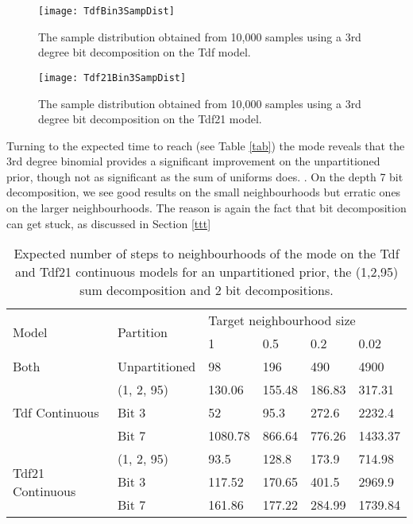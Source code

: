\begin{figure}[H]
    \centering
    \texttt{[image: TdfBin3SampDist]}
    \caption{The sample distribution obtained from 10,000 samples using a 3rd degree bit decomposition on the Tdf model.}
    \label{fig:B3SampDist}
\end{figure}

\begin{figure}[H]
    \centering
    \texttt{[image: Tdf21Bin3SampDist]}
    \caption{The sample distribution obtained from 10,000 samples using a 3rd degree bit decomposition on the Tdf21 model.}
    \label{fig:21B3SampDist}
\end{figure}

Turning to the expected time to reach (see Table \ref{tab}) the mode reveals that the 3rd degree binomial provides a significant improvement on the unpartitioned prior, though not as significant as the sum of uniforms does. . On the depth 7 bit decomposition, we see good results on the small neighbourhoods but erratic ones on the larger neighbourhoods. The reason is again the fact that bit decomposition can get stuck, as discussed in Section \ref{ttt}

\begin{table}[H]
  \centering
  \begin{tabular}{llllll}
    \toprule
    \multirow{2}{*}{Model} & \multirow{2}{*}{Partition} & \multicolumn{4}{l}{Target neighbourhood size} \\
    \cmidrule(r){3-6} 
    & & 1 & 0.5 & 0.2 & 0.02 \\
    \midrule
    Both & Unpartitioned & 98 & 196 & 490 & 4900 \\
    \midrule
    \multirow{3}{*}{Tdf Continuous} & (1, 2, 95) & 130.06 & 155.48  & 186.83 & 317.31 \\
    & Bit 3 & 52 & 95.3  & 272.6 & 2232.4 \\
    & Bit 7 & 1080.78 & 866.64 & 776.26 & 1433.37 \\
    \midrule
    \multirow{3}{*}{Tdf21 Continuous} & (1, 2, 95) & 93.5 & 128.8  & 173.9 & 714.98 \\
    & Bit 3 & 117.52 & 170.65  & 401.5 & 2969.9 \\
    & Bit 7 & 161.86 & 177.22 & 284.99 & 1739.84 \\
    \bottomrule
  \end{tabular}
  \caption{Expected number of steps to neighbourhoods of the mode on the Tdf and Tdf21 continuous models for an unpartitioned prior, the (1,2,95) sum decomposition and 2 bit decompositions.}
  \label{tab:bestParts}
\end{table}

